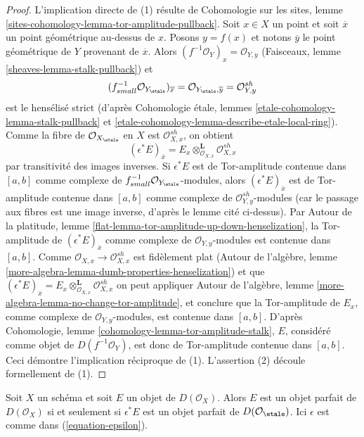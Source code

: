 \begin{proof}
L'implication directe de (1) r\'esulte de Cohomologie sur les sites, lemme
\ref{sites-cohomology-lemma-tor-amplitude-pullback}.
Soit $x \in X$ un point et soit $\overline{x}$ un point g\'eom\'etrique
au-dessus de $x$. Posons $y=f(x)$ et notons $\overline{y}$ le point
g\'eom\'etrique de $Y$ provenant de $\overline{x}$. Alors
$(f^{-1}\mathcal{O}_Y)_x = \mathcal{O}_{Y,y}$ (Faisceaux, lemme
\ref{sheaves-lemma-stalk-pullback}) et
$$
(f_{small}^{-1}\mathcal{O}_{Y_\etale})_{\overline{x}} =
\mathcal{O}_{Y_\etale, \overline{y}} =
\mathcal{O}_{Y, y}^{sh}
$$
est le hens\'elis\'e strict (d'apr\`es Cohomologie \'etale, lemmes
\ref{etale-cohomology-lemma-stalk-pullback} et
\ref{etale-cohomology-lemma-describe-etale-local-ring}).
Comme la fibre de $\mathcal{O}_{X_\etale}$ en $X$ est
$\mathcal{O}_{X,x}^{sh}$, on obtient
$$
(\epsilon^*E)_{\overline{x}} =
E_x \otimes_{\mathcal{O}_{X, x}}^\mathbf{L} \mathcal{O}_{X, x}^{sh}
$$
par transitivit\'e des images inverses. Si $\epsilon^*E$ est de Tor-amplitude
contenue dans $[a,b]$ comme complexe de
$f_{small}^{-1}\mathcal{O}_{Y_\etale}$-modules, alors
$(\epsilon^*E)_{\overline{x}}$ est de Tor-amplitude contenue dans $[a,b]$
comme
complexe de $\mathcal{O}_{Y,y}^{sh}$-modules (car le passage aux fibres est
une image inverse, d'apr\`es le lemme cit\'e ci-dessus). Par Autour de la
platitude, lemme \ref{flat-lemma-tor-amplitude-up-down-henselization},
la Tor-amplitude de
$(\epsilon^*E)_{\overline{x}}$
comme complexe de $\mathcal{O}_{Y,y}$-modules est contenue dans $[a,b]$.
Comme $\mathcal{O}_{X,x} \to \mathcal{O}_{X,x}^{sh}$ est fid\`element plat
(Autour de l'alg\`ebre, lemme
\ref{more-algebra-lemma-dumb-properties-henselization}) et que
$(\epsilon^*E)_{\overline{x}} =
E_x \otimes_{\mathcal{O}_{X, x}}^\mathbf{L} \mathcal{O}_{X, x}^{sh}$
on peut appliquer Autour de l'alg\`ebre, lemme
\ref{more-algebra-lemma-no-change-tor-amplitude}, et conclure que la
Tor-amplitude de $E_x$, comme complexe de
$\mathcal{O}_{Y,y}$-modules, est contenue
dans $[a,b]$. D'apr\`es Cohomologie, lemme
\ref{cohomology-lemma-tor-amplitude-stalk}, $E$, consid\'er\'e comme objet de
$D(f^{-1}\mathcal{O}_Y)$, est donc de Tor-amplitude contenue dans $[a,b]$.
Ceci d\'emontre l'implication r\'eciproque de (1). L'assertion (2) d\'ecoule
formellement de (1).
\end{proof}

\begin{lemma}
\label{lemma-descend-perfect}
Soit $X$ un sch\'ema et soit $E$ un objet de $D(\mathcal{O}_X)$. Alors $E$ est
un objet parfait de $D(\mathcal{O}_X)$ si et seulement si $\epsilon^*E$ est
un objet parfait de $D(\mathcal{O}_\etale)$. Ici $\epsilon$ est comme dans
(\ref{equation-epsilon}).
\end{lemma}

